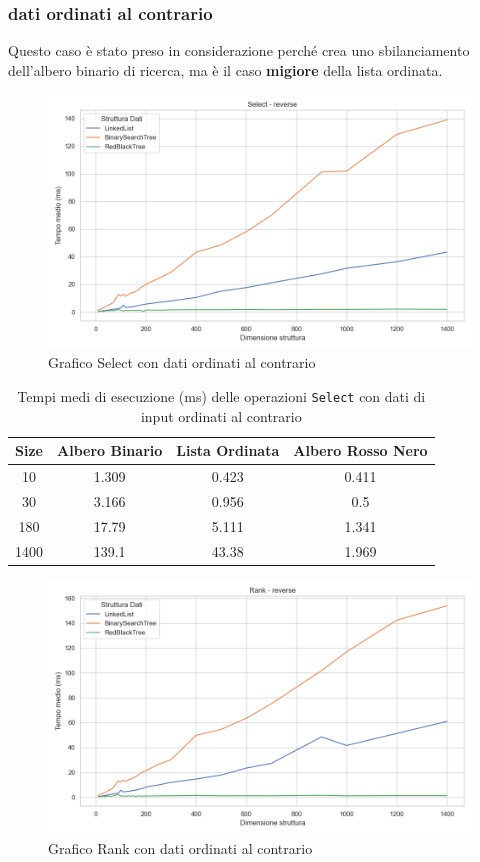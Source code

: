 \documentclass[10pt]{article}
\begin{document}
\subsubsection{dati ordinati al contrario}
Questo caso è stato preso in considerazione perché crea uno sbilanciamento dell'albero binario di ricerca, ma è il caso \textbf{migiore} della lista ordinata.
\begin{figure}[H]
    \centering
    \includegraphics[width=0.8\linewidth]{plots/confronto/reverse_select.png}
    \caption{Grafico Select con dati ordinati al contrario}
    \label{confronto-select-reverse}
\end{figure}
\begin{table}[H]
\centering
\begin{tabular}{|c|c|c|c|}
\hline
\textbf{Size} & \textbf{Albero Binario} & \textbf{Lista Ordinata} & \textbf{Albero Rosso Nero} \\
\hline
10     & 1.309 & 0.423 & 0.411 \\
30     & 3.166 & 0.956  & 0.5 \\
180    & 17.79 & 5.111  & 1.341 \\
1400   & 139.1 & 43.38  & 1.969 \\
\hline
\end{tabular}
\caption{Tempi medi di esecuzione (ms) delle operazioni \texttt{Select} con dati di input ordinati al contrario}
\label{tab:confronto-select-reverse}
\end{table}
\begin{figure}[H]
    \centering
    \includegraphics[width=0.8\linewidth]{plots/confronto/reverse_rank.png}
    \caption{Grafico Rank con dati ordinati al contrario}
    \label{confronto-rank-reverse}
\end{figure}
\end{document}
